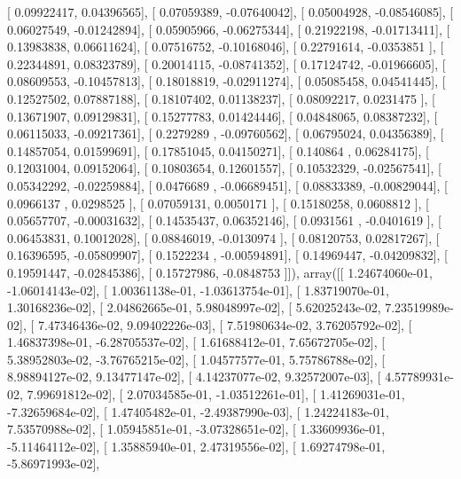 \documentclass{article}
\begin{document}
       [ 0.09922417,  0.04396565],
       [ 0.07059389, -0.07640042],
       [ 0.05004928, -0.08546085],
       [ 0.06027549, -0.01242894],
       [ 0.05905966, -0.06275344],
       [ 0.21922198, -0.01713411],
       [ 0.13983838,  0.06611624],
       [ 0.07516752, -0.10168046],
       [ 0.22791614, -0.0353851 ],
       [ 0.22344891,  0.08323789],
       [ 0.20014115, -0.08741352],
       [ 0.17124742, -0.01966605],
       [ 0.08609553, -0.10457813],
       [ 0.18018819, -0.02911274],
       [ 0.05085458,  0.04541445],
       [ 0.12527502,  0.07887188],
       [ 0.18107402,  0.01138237],
       [ 0.08092217,  0.0231475 ],
       [ 0.13671907,  0.09129831],
       [ 0.15277783,  0.01424446],
       [ 0.04848065,  0.08387232],
       [ 0.06115033, -0.09217361],
       [ 0.2279289 , -0.09760562],
       [ 0.06795024,  0.04356389],
       [ 0.14857054,  0.01599691],
       [ 0.17851045,  0.04150271],
       [ 0.140864  ,  0.06284175],
       [ 0.12031004,  0.09152064],
       [ 0.10803654,  0.12601557],
       [ 0.10532329, -0.02567541],
       [ 0.05342292, -0.02259884],
       [ 0.0476689 , -0.06689451],
       [ 0.08833389, -0.00829044],
       [ 0.0966137 ,  0.0298525 ],
       [ 0.07059131,  0.0050171 ],
       [ 0.15180258,  0.0608812 ],
       [ 0.05657707, -0.00031632],
       [ 0.14535437,  0.06352146],
       [ 0.0931561 , -0.0401619 ],
       [ 0.06453831,  0.10012028],
       [ 0.08846019, -0.0130974 ],
       [ 0.08120753,  0.02817267],
       [ 0.16396595, -0.05809907],
       [ 0.1522234 , -0.00594891],
       [ 0.14969447, -0.04209832],
       [ 0.19591447, -0.02845386],
       [ 0.15727986, -0.0848753 ]]), array([[  1.24674060e-01,  -1.06014143e-02],
       [  1.00361138e-01,  -1.03613754e-01],
       [  1.83719070e-01,   1.30168236e-02],
       [  2.04862665e-01,   5.98048997e-02],
       [  5.62025243e-02,   7.23519989e-02],
       [  7.47346436e-02,   9.09402226e-03],
       [  7.51980634e-02,   3.76205792e-02],
       [  1.46837398e-01,  -6.28705537e-02],
       [  1.61688412e-01,   7.65672705e-02],
       [  5.38952803e-02,  -3.76765215e-02],
       [  1.04577577e-01,   5.75786788e-02],
       [  8.98894127e-02,   9.13477147e-02],
       [  4.14237077e-02,   9.32572007e-03],
       [  4.57789931e-02,   7.99691812e-02],
       [  2.07034585e-01,  -1.03512261e-01],
       [  1.41269031e-01,  -7.32659684e-02],
       [  1.47405482e-01,  -2.49387990e-03],
       [  1.24224183e-01,   7.53570988e-02],
       [  1.05945851e-01,  -3.07328651e-02],
       [  1.33609936e-01,  -5.11464112e-02],
       [  1.35885940e-01,   2.47319556e-02],
       [  1.69274798e-01,  -5.86971993e-02],
\end{document}
